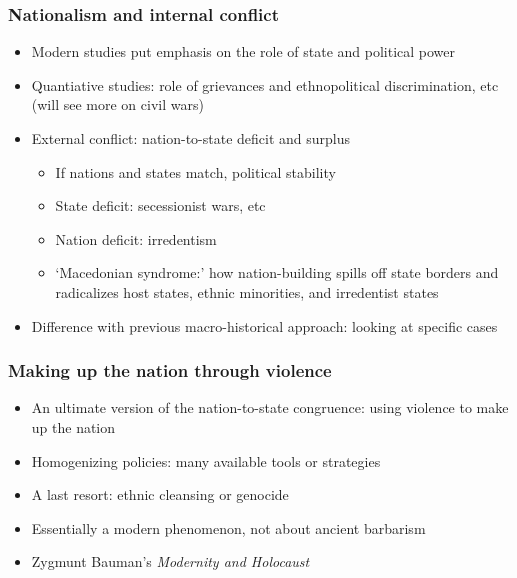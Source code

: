 \documentclass[utf8, xcolor=dvipsnames]{beamer}
\begin{document}
\begin{frame}
\frametitle{Nationalism and internal conflict}
\centering

\begin{itemize}[<+->]
  \item Modern studies put emphasis on the role of state and political power
  \item Quantiative studies: role of grievances and ethnopolitical discrimination, etc (will see more on civil wars)
  \item External conflict: nation-to-state deficit and surplus
  \begin{itemize}
    \item If nations and states match, political stability
    \item State deficit: secessionist wars, etc
    \item Nation deficit: irredentism
    \item `Macedonian syndrome:' how nation-building spills off state borders and radicalizes host states, ethnic minorities, and irredentist states
  \end{itemize}
  \item Difference with previous macro-historical approach: looking at specific cases
\end{itemize}

\end{frame}

\begin{frame}
\frametitle{Making up the nation through violence}
\centering

\begin{itemize}[<+->]
  \item An ultimate version of the nation-to-state congruence: using violence to make up the nation
  \item Homogenizing policies: many available tools or strategies
  \item A last resort: ethnic cleansing or genocide
  \item Essentially a modern phenomenon, not about ancient barbarism
  \item Zygmunt Bauman's \textit{Modernity and Holocaust}
\end{itemize}

\end{frame}
\end{document}
